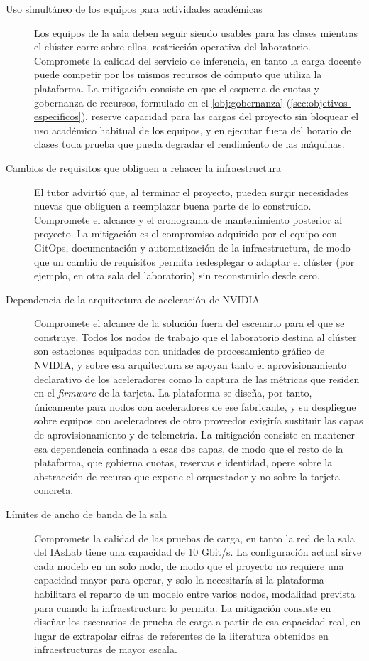 \begin{description}
  \item[Uso simultáneo de los equipos para actividades académicas] Los equipos de la sala deben seguir siendo usables para las clases mientras el clúster corre sobre ellos, restricción operativa del laboratorio. Compromete la calidad del servicio de inferencia, en tanto la carga docente puede competir por los mismos recursos de cómputo que utiliza la plataforma. La mitigación consiste en que el esquema de cuotas y gobernanza de recursos, formulado en el \cref{obj:gobernanza} (\cref{sec:objetivos-especificos}), reserve capacidad para las cargas del proyecto sin bloquear el uso académico habitual de los equipos, y en ejecutar fuera del horario de clases toda prueba que pueda degradar el rendimiento de las máquinas.
  \item[Cambios de requisitos que obliguen a rehacer la infraestructura] El tutor advirtió que, al terminar el proyecto, pueden surgir necesidades nuevas que obliguen a reemplazar buena parte de lo construido. Compromete el alcance y el cronograma de mantenimiento posterior al proyecto. La mitigación es el compromiso adquirido por el equipo con GitOps, documentación y automatización de la infraestructura, de modo que un cambio de requisitos permita redesplegar o adaptar el clúster (por ejemplo, en otra sala del laboratorio) sin reconstruirlo desde cero.
  \item[Dependencia de la arquitectura de aceleración de NVIDIA] Compromete el alcance de la solución fuera del escenario para el que se construye. Todos los nodos de trabajo que el laboratorio destina al clúster son estaciones equipadas con unidades de procesamiento gráfico de NVIDIA, y sobre esa arquitectura se apoyan tanto el aprovisionamiento declarativo de los aceleradores como la captura de las métricas que residen en el \emph{firmware} de la tarjeta. La plataforma se diseña, por tanto, únicamente para nodos con aceleradores de ese fabricante, y su despliegue sobre equipos con aceleradores de otro proveedor exigiría sustituir las capas de aprovisionamiento y de telemetría. La mitigación consiste en mantener esa dependencia confinada a esas dos capas, de modo que el resto de la plataforma, que gobierna cuotas, reservas e identidad, opere sobre la abstracción de recurso que expone el orquestador y no sobre la tarjeta concreta.
  \item[Límites de ancho de banda de la sala] Compromete la calidad de las pruebas de carga, en tanto la red de la sala del IAsLab tiene una capacidad de 10 Gbit/s. La configuración actual sirve cada modelo en un solo nodo, de modo que el proyecto no requiere una capacidad mayor para operar, y solo la necesitaría si la plataforma habilitara el reparto de un modelo entre varios nodos, modalidad prevista para cuando la infraestructura lo permita. La mitigación consiste en diseñar los escenarios de prueba de carga a partir de esa capacidad real, en lugar de extrapolar cifras de referentes de la literatura obtenidos en infraestructuras de mayor escala.
\end{description}

